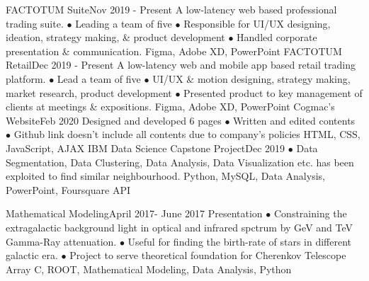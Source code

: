 %
%
%

\begin{projects}
  \project
    {FACTOTUM Suite}{Nov 2019 - Present}
    {}
    { A low-latency web based professional trading suite. $\bullet$ Leading a team of five $\bullet$ Responsible for UI/UX designing, ideation, strategy making, \& product development $\bullet$ Handled corporate presentation \& communication.}
    {Figma, Adobe XD, PowerPoint}
  \project
    {FACTOTUM Retail}{Dec 2019 - Present}
    { }
    {A low-latency web and mobile app based retail trading platform. $\bullet$ Lead a team of five $\bullet$ UI/UX \& motion designing, strategy making, market research, product development $\bullet$ Presented product to key management of clients at meetings \& expositions.}
    {Figma, Adobe XD, PowerPoint}
   \project   
    {Cogmac's Website}{Feb 2020}
    { }
    {Designed and developed 6 pages $\bullet$ Written and edited contents $\bullet$ Github link doesn't include all contents due to company's policies}
    {HTML, CSS, JavaScript, AJAX}
    \project
    {IBM Data Science Capstone Project}{Dec 2019}
    {  }
    {$\bullet$ Data Segmentation, Data Clustering, Data Analysis, Data Visualization etc. has been exploited to find similar neighbourhood.}
    {Python, MySQL, Data Analysis, PowerPoint, Foursquare API}
    
   \project
    {Mathematical Modeling}{April 2017- June 2017}
    {  {Presentation}}
    {$\bullet$ Constraining the extragalactic background light in optical and infrared spctrum by GeV and TeV Gamma-Ray attenuation. $\bullet$ Useful for finding the birth-rate of stars in different galactic era. $\bullet$ Project to serve theoretical foundation for Cherenkov Telescope Array}
    {C, ROOT, Mathematical Modeling, Data Analysis, Python}
    

\end{projects}
